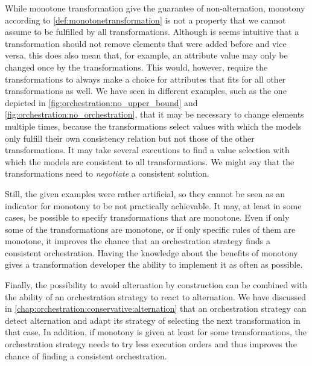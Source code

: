 While monotone transformation give the guarantee of non-alternation, monotony according to \autoref{def:monotonetransformation} is not a property that we cannot assume to be fulfilled by all transformations.
Although is seems intuitive that a transformation should not remove elements that were added before and vice versa, this does also mean that, for example, an attribute value may only be changed once by the transformations.
This would, however, require the transformations to always make a choice for attributes that fits for all other transformations as well.
We have seen in different examples, such as the one depicted in \autoref{fig:orchestration:no_upper_bound} and \autoref{fig:orchestration:no_orchestration}, that it may be necessary to change elements multiple times, because the transformations select values with which the models only fulfill their own consistency relation but not those of the other transformations.
It may take several executions to find a value selection with which the models are consistent to all transformations.
We might say that the transformations need to \emph{negotiate} a consistent solution.

Still, the given examples were rather artificial, so they cannot be seen as an indicator for monotony to be not practically achievable.
It may, at least in some cases, be possible to specify transformations that are monotone.
Even if only some of the transformations are monotone, or if only specific rules of them are monotone, it improves the chance that an orchestration strategy finds a consistent orchestration.
Having the knowledge about the benefits of monotony gives a transformation developer the ability to implement it as often as possible.

Finally, the possibility to avoid alternation by construction can be combined with the ability of an orchestration strategy to react to alternation.
We have discussed in \autoref{chap:orchestration:conservative:alternation} that an orchestration strategy can detect alternation and adapt its strategy of selecting the next transformation in that case.
In addition, if monotony is given at least for some transformations, the orchestration strategy needs to try less execution orders and thus improves the chance of finding a consistent orchestration.


